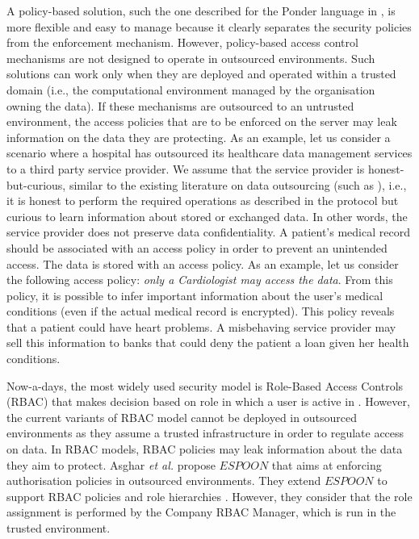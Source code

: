 \documentclass[final,5p,times,twocolumn]{elsarticle}
\begin{document}
A policy-based solution, such the one described for the Ponder language in \cite{Russello2007}, is more flexible and easy to manage because it clearly separates the security policies from the enforcement mechanism. However, policy-based access control mechanisms are not designed to operate in outsourced environments. Such solutions can work only when they are deployed and operated within a trusted domain (i.e., the computational environment managed by the organisation owning the data). If these mechanisms are outsourced to an untrusted environment, the access policies that are to be enforced on the server may leak information on the data they are protecting. As an example, let us consider a scenario where a hospital has outsourced its healthcare data management services to a third party service provider. We assume that the service provider is honest-but-curious, similar to the existing literature on data outsourcing (such as \cite{Vimercati2007}), i.e., it is honest to perform the required operations as described in the protocol but curious to learn information about stored or exchanged data. In other words, the service provider does not preserve data confidentiality. A patient's medical record should be associated with an access policy in order to prevent an unintended access. The data is stored with an access policy. As an example, let us consider the following access policy: \emph{only a Cardiologist may access the data}. From this policy, it is possible to infer important information about the user's medical conditions (even if the actual medical record is encrypted). This policy reveals that a patient could have heart problems. A misbehaving service provider may sell this information to banks that could deny the patient a loan given her health conditions.

Now-a-days, the most widely used security model is Role-Based Access Controls (RBAC) \cite{Sandhu1996} that makes decision based on role in which a user is active in \cite{Connor2010}. However, the current variants of RBAC model cannot be deployed in outsourced environments as they assume a trusted infrastructure in order to regulate access on data. In RBAC models, RBAC policies may leak information about the data they aim to protect. Asghar \emph{et al.} \cite{Asghar2011ARES} propose $\mathit{ESPOON}$ that aims at enforcing authorisation policies in outsourced environments. They extend $\mathit{ESPOON}$ \cite{Asghar2011ARES} to support RBAC policies and role hierarchies \cite{Asghar2011CCS}. However, they consider that the role assignment is performed by the Company RBAC Manager, which is run in the trusted environment.
\end{document}
